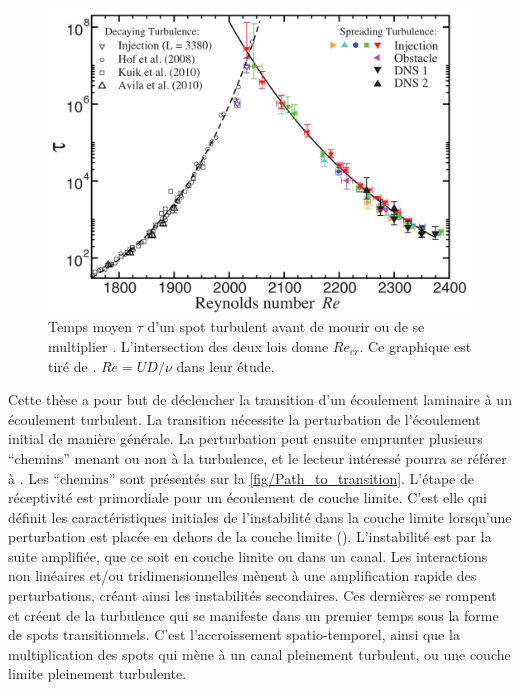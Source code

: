 \begin{figure}[!htbp]
    \centering
    \includegraphics[width=.85\linewidth]{Chap1/Pictures/Re_cr_Avila_2011.png}
    \caption{\centering Temps moyen $\tau$ d'un spot turbulent avant de mourir  ou de se multiplier . L'intersection des deux lois donne $Re_{cr}$. Ce graphique est tiré de \cite{Avila2011}. $Re=UD/\nu$ dans leur étude.}
    \label{fig/Re_cr_Avila_2011}
\end{figure}

\clearpage
Cette thèse a pour but de déclencher la transition d’un écoulement laminaire à un écoulement turbulent. La transition nécessite la perturbation de l’écoulement initial de manière générale. La perturbation peut ensuite emprunter plusieurs \foreignquote{french}{chemins} menant ou non à la turbulence, et le lecteur intéressé pourra se référer à \citet*{Morkovin1994}. Les \foreignquote{french}{chemins} sont présentés sur la \cref{fig/Path_to_transition}. L'étape de réceptivité est primordiale pour un écoulement de couche limite. C'est elle qui définit les caractéristiques initiales de l'instabilité dans la couche limite lorsqu'une perturbation est placée en dehors de la couche limite (\cite{Morkovin1969}). L'instabilité est par la suite amplifiée, que ce soit en couche limite ou dans un canal. Les interactions non linéaires et/ou tridimensionnelles mènent à une amplification rapide des perturbations, créant ainsi les instabilités secondaires. Ces dernières se rompent et créent de la turbulence qui se manifeste dans un premier temps sous la forme de spots transitionnels. C'est l'accroissement spatio-temporel, ainsi que la multiplication des spots qui mène à un canal pleinement turbulent, ou une couche limite pleinement turbulente.

